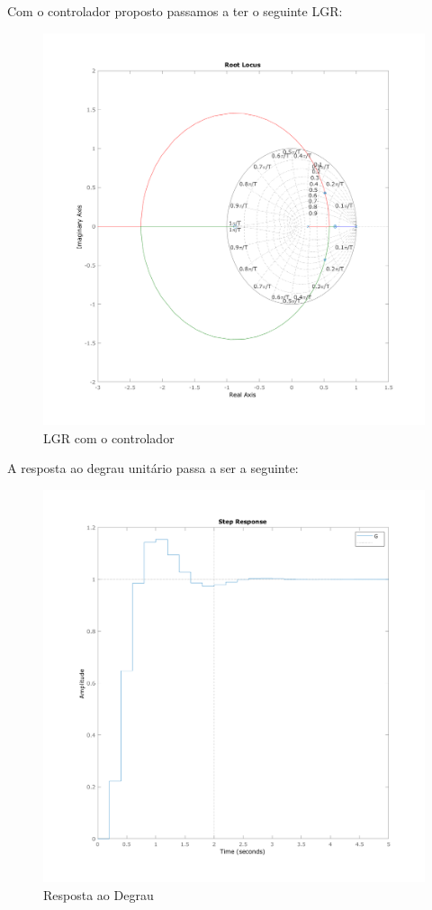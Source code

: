 \documentclass[a4paper,11pt]{article}
\begin{document}
Com o controlador proposto passamos a ter o seguinte LGR:

\begin{figure}[H]
    \centering
    \includegraphics[width=0.8\linewidth]{img/exsim3-rlocus-g2-control.png}
    \caption{LGR com o controlador}
    \label{fig:ex3-rlocus-g2-control}
\end{figure}

A resposta ao degrau unitário passa a ser a seguinte:

\begin{figure}[H]
    \centering
    \includegraphics[width=0.8\linewidth]{img/exsim3-step-g2-control.png}
    \caption{Resposta ao Degrau}
    \label{fig:ex3-step-g2-control}
\end{figure}
\end{document}
